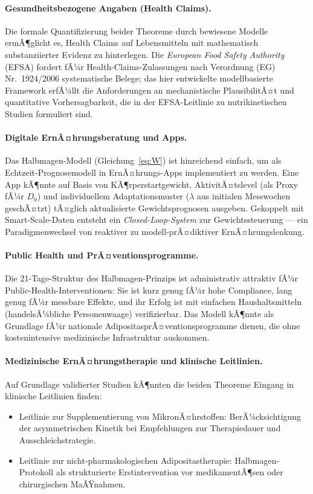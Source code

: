 ﻿\documentclass[12pt,a4paper]{article}
\theoremstyle{plain}
\theoremstyle{definition}
\theoremstyle{remark}
\begin{document}
\paragraph{Gesundheitsbezogene Angaben (Health Claims).}
Die formale Quantifizierung beider Theoreme durch bewiesene Modelle
ermÃ¶glicht es, Health Claims auf Lebensmitteln mit mathematisch
substanziierter Evidenz zu hinterlegen. Die \textit{European Food Safety
Authority} (EFSA) fordert fÃ¼r Health-Claims-Zulassungen nach Verordnung
(EG) Nr.~1924/2006 systematische Belege; das hier entwickelte
modellbasierte Framework erfÃ¼llt die Anforderungen an mechanistische
PlausibilitÃ¤t und quantitative Vorhersagbarkeit, die in der
EFSA-Leitlinie zu nutrikinetischen Studien formuliert sind.

\paragraph{Digitale ErnÃ¤hrungsberatung und Apps.}
Das Halbmagen-Modell (Gleichung~\eqref{eq:W}) ist hinreichend einfach, um
als Echtzeit-Prognosemodell in ErnÃ¤hrungs-Apps implementiert zu werden.
Eine App kÃ¶nnte auf Basis von KÃ¶rperstartgewicht, AktivitÃ¤tslevel (als
Proxy fÃ¼r $D_0$) und individuellem Adaptationsmuster ($\lambda$ aus
initialen Messwochen geschÃ¤tzt) tÃ¤glich aktualisierte Gewichtsprognosen
ausgeben. Gekoppelt mit Smart-Scale-Daten entsteht ein
\emph{Closed-Loop-System} zur Gewichtssteuerung --- ein Paradigmenwechsel
von reaktiver zu modell-prÃ¤diktiver ErnÃ¤hrungslenkung.

\paragraph{Public Health und PrÃ¤ventionsprogramme.}
Die 21-Tage-Struktur des Halbmagen-Prinzips ist administrativ attraktiv
fÃ¼r Public-Health-Interventionen: Sie ist kurz genug fÃ¼r hohe Compliance,
lang genug fÃ¼r messbare Effekte, und ihr Erfolg ist mit einfachen
Haushaltsmitteln (handelsÃ¼bliche Personenwaage) verifizierbar. Das Modell
kÃ¶nnte als Grundlage fÃ¼r nationale AdipositasprÃ¤ventionsprogramme dienen,
die ohne kostenintensive medizinische Infrastruktur auskommen.

\paragraph{Medizinische ErnÃ¤hrungstherapie und klinische Leitlinien.}
Auf Grundlage validierter Studien kÃ¶nnten die beiden Theoreme Eingang in
klinische Leitlinien finden:
\begin{itemize}
  \item Leitlinie zur Supplementierung von MikronÃ¤hrstoffen:
        BerÃ¼cksichtigung der asymmetrischen Kinetik bei Empfehlungen
        zur Therapiedauer und Ausschleichstrategie.
  \item Leitlinie zur nicht-pharmakologischen Adipositastherapie:
        Halbmagen-Protokoll als strukturierte Erstintervention vor
        medikamentÃ¶sen oder chirurgischen MaÃŸnahmen.
\end{itemize}
\end{document}
